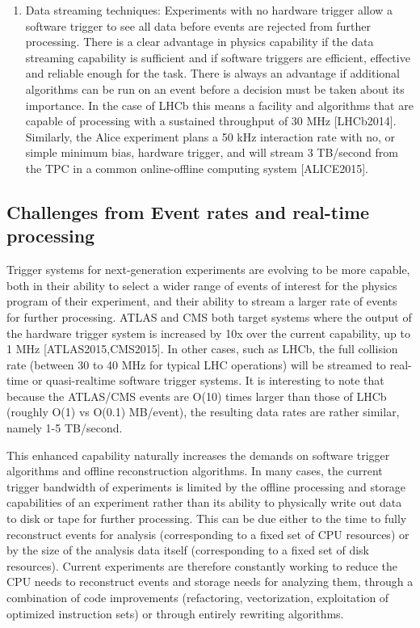 \begin{enumerate}
\item
Data streaming techniques: Experiments with no hardware trigger allow a software trigger to see all data before events are rejected from further processing. There is a clear advantage in physics capability if the data streaming capability is sufficient and if software triggers are efficient, effective and reliable enough for the task. There is always an advantage if additional algorithms can be run on an event before a decision must be taken about its importance. In the case of LHCb this means a facility and algorithms that are capable of processing with a sustained throughput of 30 MHz [LHCb2014]. Similarly, the Alice experiment plans a 50 kHz interaction rate with no, or simple minimum bias, hardware trigger, and will stream 3 TB/second from the TPC in a common online-offline computing system [ALICE2015].
\end{enumerate}

\subsection{Challenges from Event rates and real-time processing}

Trigger systems for next-generation experiments are evolving to be more capable, both in their ability to select a wider range of events of interest for the physics program of their experiment, and their ability to stream a larger rate of events for further processing.  ATLAS and CMS both target systems where the output of the hardware trigger system is increased by 10x over the current capability, up to 1 MHz [ATLAS2015,CMS2015]. In other cases, such as LHCb, the full collision rate (between 30 to 40 MHz for typical LHC operations) will be streamed to real-time or quasi-realtime software trigger systems. It is interesting to note that because the ATLAS/CMS events are O(10) times larger than those of LHCb (roughly O(1) vs O(0.1) MB/event), the resulting data rates are rather similar, namely 1-5 TB/second. 

This enhanced capability naturally increases the demands on software trigger algorithms and offline reconstruction algorithms. In many cases, the current trigger bandwidth of experiments is limited by the offline processing and storage capabilities of an experiment rather than its ability to physically write out data to disk or tape for further processing.  This can be due either to the time to fully reconstruct events for analysis (corresponding to a fixed set of CPU resources)  or by the size of the analysis data itself (corresponding to a fixed set of disk resources). Current experiments are therefore constantly working to reduce the CPU needs to reconstruct events and storage needs for analyzing them, through a combination of code improvements (refactoring, vectorization, exploitation of optimized instruction sets) or through entirely rewriting algorithms. 

